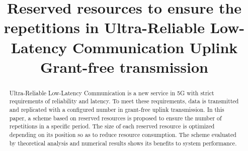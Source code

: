 \documentclass[conference]{IEEEtran}
\begin{document}
\title{Reserved resources to ensure the repetitions in Ultra-Reliable Low-Latency Communication Uplink Grant-free transmission\\
}

\author{
\and
{}
}

\maketitle

\begin{abstract}
Ultra-Reliable Low-Latency Communication is a new service in 5G with strict requirements of reliability and latency. To meet these requirements, data is transmitted and replicated with a configured number in grant-free uplink transmission. In this paper, a scheme based on reserved resources is proposed to ensure the number of repetitions in a specific period. The size of each reserved resource is optimized depending on its position so as to reduce resource consumption. The scheme evaluated by theoretical analysis and numerical results shows its benefits to system performance.
\end{abstract}
\end{document}

